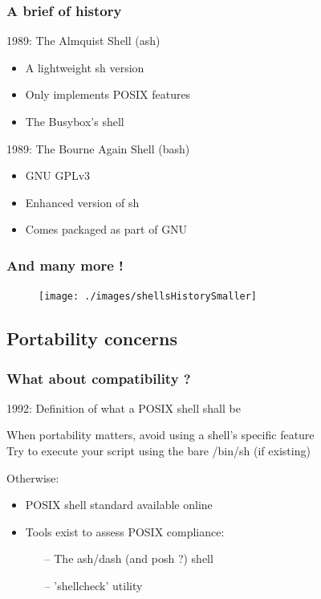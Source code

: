 \documentclass[aspectratio=169,10pt]{beamer}
\begin{document}
\begin{frame}
    \frametitle{A brief of history}

    1989: The Almquist Shell (ash)
    \begin{itemize}
        \item A lightweight sh version
        \item Only implements POSIX features
        \item The Busybox's shell
    \end{itemize}

    \vspace{\baselineskip}

    1989: The Bourne Again Shell (bash)
    \begin{itemize}
        \item GNU GPLv3
        \item Enhanced version of sh
        \item Comes packaged as part of GNU
    \end{itemize}

\end{frame}

\begin{frame}
  \frametitle{And many more !}
    \begin{figure}[h]
        \texttt{[image: ./images/shellsHistorySmaller]}
    \end{figure}
\end{frame}

\subsection{Portability concerns}

\begin{frame}
    \frametitle{What about compatibility ?}
    1992: Definition of what a POSIX shell shall be

    \vspace{\baselineskip}

    When portability matters, avoid using a shell's specific feature\\
    Try to execute your script using the bare /bin/sh (if existing)

    \vspace{\baselineskip}

    Otherwise:
    \begin{itemize}

        \item POSIX shell standard available online
        \item Tools exist to assess POSIX compliance:
            \begin{itemize}
                \item[--] The ash/dash (and posh ?) shell
                \item[--] 'shellcheck' utility
            \end{itemize}
    \end{itemize}
\end{frame}
\end{document}

